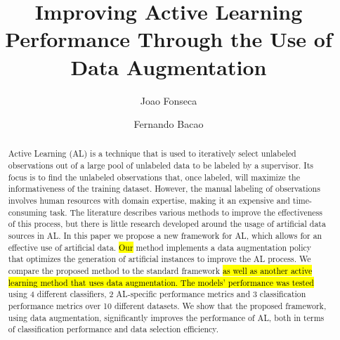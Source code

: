 \documentclass[preprint, 12pt]{elsarticle}
\begin{document}
\begin{frontmatter}

\title{%
    Improving Active Learning Performance Through the Use of Data Augmentation
}

\author[inst1]{Joao Fonseca}
\author[inst1]{Fernando Bacao}


\begin{abstract}

    Active Learning (AL) is a technique that is used to iteratively select
    unlabeled observations out of a large pool of unlabeled data to be labeled
    by a supervisor. Its focus is to find the unlabeled observations that,
    once labeled, will maximize the informativeness of the training dataset.
    However, the manual labeling of observations involves human resources with
    domain expertise, making it an expensive and time-consuming task. The
    literature describes various methods to improve the effectiveness of this
    process, but there is little research developed around the usage of
    artificial data sources in AL\@. In this paper we propose a new framework
    for AL, which allows for an effective use of artificial data. \hl{Our}
    method implements a data augmentation policy that optimizes the generation
    of artificial instances to improve the AL process. We compare the proposed
    method to the standard framework \hl{as well as another active learning
    method that uses data augmentation. The models' performance was tested}
    using 4 different classifiers, 2 AL-specific performance metrics and 3
    classification performance metrics over 10 different datasets. We show
    that the proposed framework, using data augmentation, significantly
    improves the performance of AL, both in terms of classification
    performance and data selection efficiency. 
    
\end{abstract}


\end{frontmatter}
\end{document}
